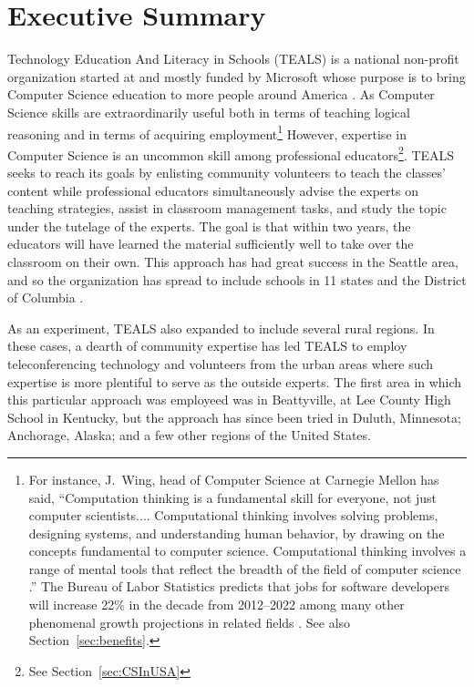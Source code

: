 
\section{Executive Summary}

Technology Education And Literacy in Schools (TEALS) is a national non-profit organization started at and
mostly funded by Microsoft whose purpose is to bring Computer Science education
to more people around America \autocite{TEALSWeb}. As Computer Science skills are extraordinarily
useful both in terms of teaching logical reasoning\autocite{????} and in terms of
acquiring employment\footnote{For instance, J.~Wing, head of Computer Science at Carnegie Mellon has
said, ``Computation thinking is a fundamental skill for everyone, not just computer scientists.... Computational thinking involves solving problems, designing systems, and understanding human behavior, by drawing on the concepts fundamental to computer science. Computational thinking involves a range of mental tools that reflect the breadth of the field of computer science \autocite[pg.~33]{ComputationalThinking}.'' The Bureau of Labor Statistics predicts that jobs for software developers will increase 22\% in the decade from 2012--2022 among many other phenomenal growth projections in related fields \cite{BLS}. See also Section~\ref{sec:benefits}.} However,
expertise in Computer Science is an uncommon skill among professional educators\footnote{See Section~\ref{sec:CSInUSA}}.
TEALS seeks to reach its goals by enlisting community volunteers to teach
the classes' content while professional educators simultaneously advise the
experts on teaching strategies, assist in classroom management tasks, and
study the topic under the tutelage of the experts. The goal is that within two
years, the educators will have learned the material sufficiently well to take
over the classroom on their own\autocite{TEALSWeb}. This approach has had great
success in the Seattle area\autocite{Statistics?}, and
so the organization has spread to include schools in 11 states and the District
of Columbia \autocite{TEALSRoster}.

As an experiment, TEALS also expanded to include several rural regions. In these
cases, a dearth of community expertise has led TEALS to employ teleconferencing
technology and volunteers from the urban areas where such expertise is more
plentiful to serve as the outside experts. The first area in which this
particular approach was employeed was in Beattyville, at Lee County High School
in Kentucky, but the approach has since been tried in Duluth, Minnesota;
Anchorage, Alaska; and a few other regions of the United States\autocite{TEALSRoster}.

